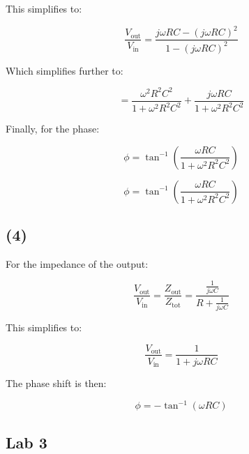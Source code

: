 \documentclass{article}
\begin{document}
This simplifies to:

\[
\frac{V_{\text{out}}}{V_{\text{in}}} = \frac{j \omega RC - (j \omega RC)^2}{1 - (j \omega RC)^2}
\]

Which simplifies further to:

\[
= \frac{\omega^2 R^2 C^2}{1 + \omega^2 R^2 C^2} + \frac{j \omega RC}{1 + \omega^2 R^2 C^2}
\]

Finally, for the phase:

\[
\phi = \tan^{-1} \left( \frac{\omega RC}{1 + \omega^2 R^2 C^2} \right)
\]

\[
\phi = \tan^{-1} \left( \frac{\omega RC}{1 + \omega^2 R^2 C^2} \right)
\]

\subsection{(4) }
For the impedance of the output:

\[
\frac{V_{\text{out}}}{V_{\text{in}}} = \frac{Z_{\text{out}}}{Z_{\text{tot}}} = \frac{\frac{1}{j \omega C}}{R + \frac{1}{j \omega C}}
\]

This simplifies to:

\[
\frac{V_{\text{out}}}{V_{\text{in}}} = \frac{1}{1 + j \omega RC}
\]

The phase shift is then:

\[
\phi = -\tan^{-1}(\omega RC)
\]


\begin{center}
    \section*{Lab 3}
\end{center}
\end{document}
